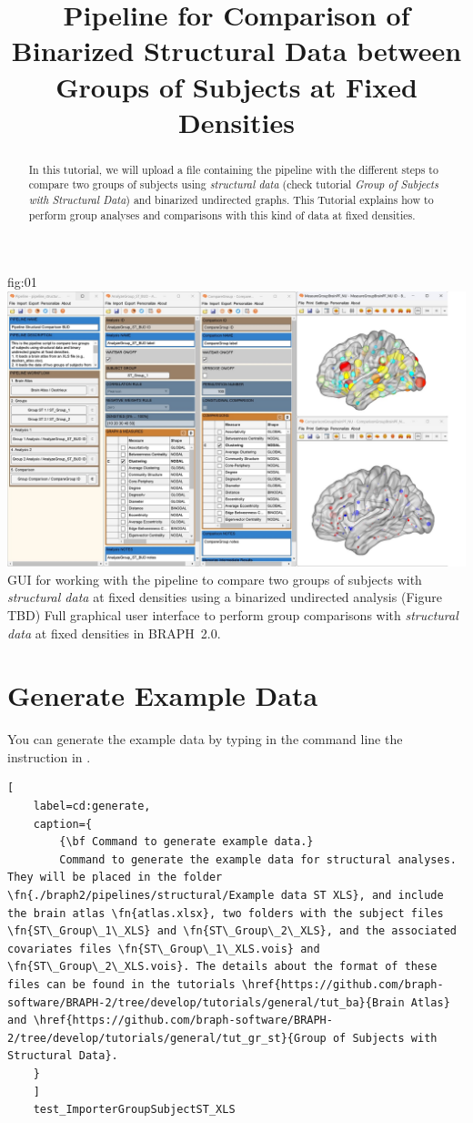 \documentclass[justified]{tufte-handout}
\title{Pipeline for Comparison of Binarized Structural Data between Groups of Subjects at Fixed Densities}
\begin{document}
\maketitle

\begin{abstract}
\noindent
In this tutorial, we will upload a file containing the pipeline with the different steps to compare two groups of subjects using \emph{structural data} (check tutorial \emph{Group of Subjects with Structural Data}) and binarized undirected graphs. This Tutorial explains how to perform group analyses and comparisons with this kind of data at fixed densities.
\end{abstract}

\tableofcontents

	{fig:01}
	{\includegraphics{fig01.jpg}}
	{GUI for working with the pipeline to compare two groups of subjects with \emph{structural data} at fixed densities using a binarized undirected analysis (Figure TBD)}
	{
	Full graphical user interface to perform group comparisons with \emph{structural data} at fixed densities in BRAPH~2.0. 
	}

\clearpage

\section{Generate Example Data}

You can generate the example data by typing in the command line the instruction in .
%
\begin{lstlisting}[
	label=cd:generate,
	caption={
		{\bf Command to generate example data.}
		Command to generate the example data for structural analyses. They will be placed in the folder \fn{./braph2/pipelines/structural/Example data ST XLS}, and include the brain atlas \fn{atlas.xlsx}, two folders with the subject files \fn{ST\_Group\_1\_XLS} and \fn{ST\_Group\_2\_XLS}, and the associated covariates files \fn{ST\_Group\_1\_XLS.vois} and \fn{ST\_Group\_2\_XLS.vois}. The details about the format of these files can be found in the tutorials \href{https://github.com/braph-software/BRAPH-2/tree/develop/tutorials/general/tut_ba}{Brain Atlas} and \href{https://github.com/braph-software/BRAPH-2/tree/develop/tutorials/general/tut_gr_st}{Group of Subjects with Structural Data}.
	}
	]
	test_ImporterGroupSubjectST_XLS
\end{lstlisting}
\end{document}
